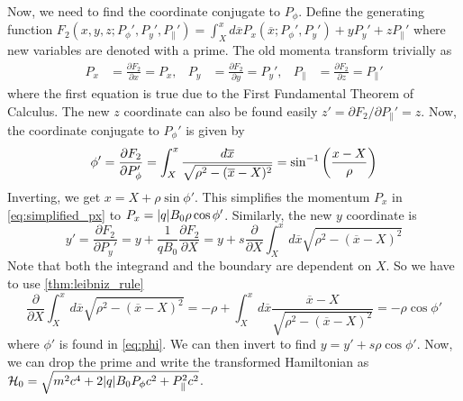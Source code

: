 Now, we need to find the coordinate conjugate to $P_\phi$. Define the generating function
$F_2(x,y,z;P_\phi',P_y',P_\parallel')=\int_X^xd\overline{x}P_x(\overline{x};P_\phi',P_y')+yP_y'+zP_\parallel'$
where new variables are denoted with a prime. The old momenta transform
trivially as \begin{align} P_x&=\frac{\partial F_2}{\partial x}=P_x, &
P_y&=\frac{\partial F_2}{\partial y}=P_y', & P_\parallel&=\frac{\partial
F_2}{\partial z}=P_\parallel' \end{align} where the first equation is true due
to the First Fundamental Theorem of Calculus. The new $z$ coordinate can also be
found easily $z'=\partial F_2/\partial P_\parallel'=z$. Now, the coordinate
conjugate to $P_\phi'$ is given by \begin{equation}\label{eq:phi}
    \phi'=\frac{\partial F_2}{\partial P_\phi'}
=\int_X^x\frac{d\overline{x}}{\sqrt{\rho^2-(\overline{x}-X)^2}}
=\sin^{-1}\qty(\frac{x-X}{\rho}) \end{equation} Inverting, we get
$x=X+\rho\sin\phi'$. This simplifies the momentum $P_x$ in
\cref{eq:simplified_px} to $P_x=\abs{q}B_0\rho\cos\phi'$. Similarly, the new $y$
coordinate is \begin{equation} y'=\frac{\partial F_2}{\partial
    P_y'}=y+\frac1{qB_0}\frac{\partial F_2}{\partial X}
    =y+s\frac{\partial}{\partial
    X}\int_X^xd\overline{x}\sqrt{\rho^2-(\overline{x}-X)^2} \end{equation} Note
    that both the integrand and the boundary are dependent on $X$. So we have to
    use \cref{thm:leibniz_rule}
    \begin{equation} \frac{\partial}{\partial
        X}\int_X^xd\overline{x}\sqrt{\rho^2-(\overline{x}-X)^2}
    =-\rho+\int_X^xd\overline{x}\frac{\overline{x}-X}{\sqrt{\rho^2-(\overline{x}-X)^2}}=-\rho\cos\phi'
\end{equation} where $\phi'$ is found in \cref{eq:phi}. We can then invert to
find $y=y'+s\rho\cos\phi'$. Now, we can drop the prime and write the transformed
Hamiltonian as $\mathcal{H}_0=\sqrt{m^2c^4+2\abs{q}B_0P_\phi c^2+P_\parallel^2c^2}$.

